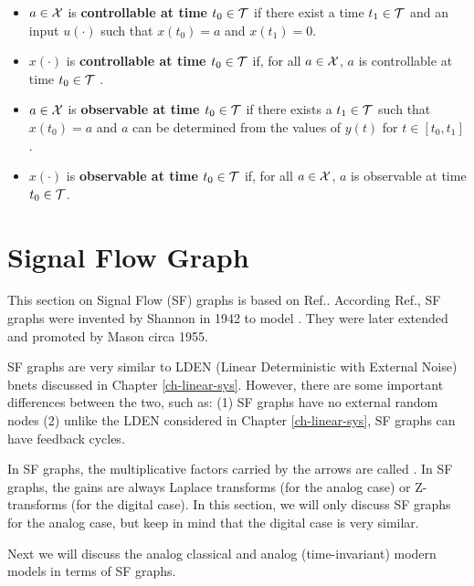  \begin{itemize}
 \item
$a\in{\cal X}$ is {\bf controllable
at time $t_0\in{\cal T}$
}
if there exist a time
$t_1\in{\cal T}$ and an input $u(\cdot)$ such that $x(t_0)=a$
and $x(t_1)=0$.
\item
$x(\cdot)$ is {\bf controllable 
at time $t_0\in{\cal T}$}
if, for all $a\in{\cal X}$, 
 $a$ is controllable 
at time $t_0\in{\cal T}$ .
\item
$a\in{\cal X}$ is {\bf observable at time $t_0\in{\cal T}$}
if there exists a $t_1\in {\cal T}$
such that 
$x(t_0)=a$
and $a$
can be determined from
the values of 
$y(t)$ for $t\in [t_0, t_1]$.
\item
$x(\cdot)$ is {\bf observable
at time $t_0\in{\cal T}$ } 
if,
for all $a\in {\cal X}$, $a$ is 
observable 
at time $t_0\in{\cal T}$.
\end{itemize}

\section{Signal Flow Graph}
This section on
Signal Flow (SF) 
graphs
is based on Ref.\cite{wiki-signal-flow}.
According Ref.\cite{wiki-signal-flow},
SF graphs were invented by Shannon
in 1942
to model .
They were later 
extended and promoted by Mason circa 1955.

SF graphs are 
very similar to
LDEN (Linear Deterministic
with External Noise) bnets discussed in
Chapter \ref{ch-linear-sys}. However, 
there are some important differences between
the two, such as: (1) SF graphs
have no external random nodes
(2)
unlike the LDEN considered in 
Chapter \ref{ch-linear-sys},
SF graphs can have feedback cycles.

In SF graphs, the
multiplicative factors
carried by the arrows  are called 
. In SF graphs,
the gains are always 
Laplace transforms (for the analog case)
or Z-transforms (for the digital case).
In this section, 
we will only discuss SF graphs for the
analog case, but keep in mind that the digital
case is very similar.

Next we will discuss the
analog classical and analog (time-invariant) modern
models in terms of SF graphs.

